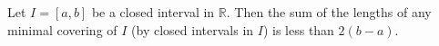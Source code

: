 Let $I = [a, b]$ be a closed interval in $\mathbb{R}$. Then the sum of the lengths of any minimal covering of $I$ (by closed intervals in $I$) is less than $2(b-a)$.
